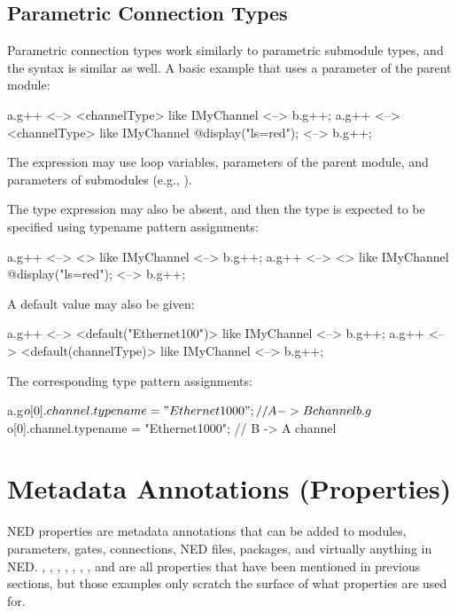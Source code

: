 \subsection{Parametric Connection Types}
\label{sec:ned-lang:connection-like}

Parametric connection types work similarly to parametric submodule types, and
the syntax is similar as well. A basic example that uses a parameter of the
parent module:

\begin{ned}
a.g++ <--> <channelType> like IMyChannel <--> b.g++;
a.g++ <--> <channelType> like IMyChannel {@display("ls=red");} <--> b.g++;
\end{ned}

The expression may use loop variables, parameters of the parent module, and
parameters of submodules (e.g., ).

The type expression may also be absent, and then the type is expected to be
specified using typename pattern assignments:

\begin{ned}
a.g++ <--> <> like IMyChannel <--> b.g++;
a.g++ <--> <> like IMyChannel {@display("ls=red");} <--> b.g++;
\end{ned}

A default value may also be given:

\begin{ned}
a.g++ <--> <default("Ethernet100")> like IMyChannel <--> b.g++;
a.g++ <--> <default(channelType)> like IMyChannel <--> b.g++;
\end{ned}

The corresponding type pattern assignments:

\begin{ned}
a.g$o[0].channel.typename = "Ethernet1000";  // A -> B channel
b.g$o[0].channel.typename = "Ethernet1000";  // B -> A channel
\end{ned}


\section{Metadata Annotations (Properties)}
\label{sec:ned-lang:properties}

NED properties are metadata annotations that can be added to modules,
parameters, gates, connections, NED files, packages, and virtually anything in
NED. , , , ,
, , , and  are all properties
that have been mentioned in previous sections, but those examples only scratch
the surface of what properties are used for.

